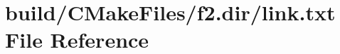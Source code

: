 \hypertarget{f2_8dir_2link_8txt}{}\section{build/\+C\+Make\+Files/f2.dir/link.txt File Reference}
\label{f2_8dir_2link_8txt}
